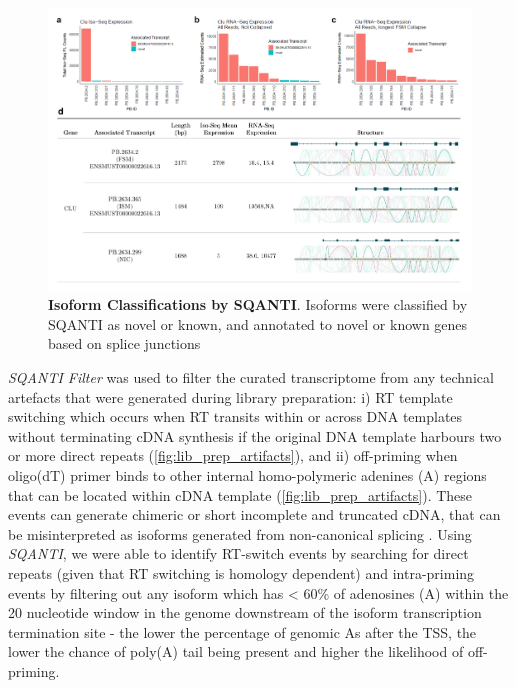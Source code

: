 \begin{landscape}
	\begin{figure}[h]
		\centering
		\includegraphics[page=3,trim={0 3cm 0 0},clip,scale = 0.8]{Figures/ProjectDevelopment_Figures_Landscape}
		\captionsetup{width=1.5\textwidth}
		\caption[Isoform Classifications by SQANTI]%
		{\textbf{Isoform Classifications by SQANTI}. Isoforms were classified by SQANTI as novel or known, and annotated to novel or known genes based on splice junctions}
		\label{fig:sqanti_cate}
	\end{figure}
\end{landscape}

\textit{SQANTI Filter} was used to filter the curated transcriptome from any technical artefacts that were generated during library preparation: i) RT template switching which occurs when RT transits within or across DNA templates without terminating cDNA synthesis if the original DNA template harbours two or more direct repeats\cite{Cocquet2006} (\cref{fig:lib_prep_artifacts}), and ii) off-priming when oligo(dT) primer binds to other internal homo-polymeric adenines (A) regions that can be located within cDNA template \cite{Conesa2016} (\cref{fig:lib_prep_artifacts}). These events can generate chimeric or short incomplete and truncated cDNA, that can be misinterpreted as isoforms generated from non-canonical splicing \cite{Houseley2010}. Using \textit{SQANTI}, we were able to identify RT-switch events by searching for direct repeats (given that RT switching is homology dependent) and intra-priming events by filtering out any isoform which has < 60\% of adenosines (A) within the 20 nucleotide window in the genome downstream of the isoform transcription termination site - the lower the percentage of genomic As after the TSS, the lower the chance of poly(A) tail being present and  higher the likelihood of off-priming. 

